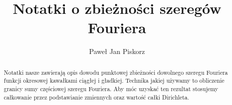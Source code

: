 \usepackage{amsmath}
\usepackage{amssymb}
\usepackage{empheq}               %
\usepackage{lmodern}
\usepackage[version=4]{mhchem}
\usepackage{microtype}


\usepackage{imakeidx}
\makeindex[columns=2, intoc]


\setlength{\textheight}{210mm}
\setlength{\textwidth}{145mm}
\setlength{\parindent}{20.0mm}

\renewcommand{\thesection}{\arabic{section}}



\newcommand{\bra}[1]{\langle #1 |}
\newcommand{\ket}[1]{| #1 \rangle}
\newcommand{\braket}[2]{\langle #1 | #2 \rangle}







\title{Notatki o zbieżności szeregów Fouriera}

\author{Paweł Jan Piskorz}

\date{}







\maketitle


\begin{abstract}
Notatki nasze zawierają opis dowodu punktowej zbieżności dowolnego szeregu Fouriera funkcji okresowej kawałkami
ciągłej i gładkiej.
Technika jakiej używamy to obliczenie granicy sumy częściowej szeregu Fouriera.
Aby móc uzyskać ten rezultat stosujemy całkowanie przez podstawianie zmiennych oraz wartość całki Dirichleta.
\end{abstract}





